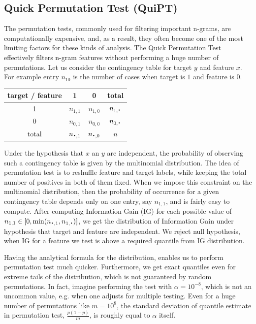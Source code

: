 \documentclass[a4,center,fleqn]{NAR}
\newcommand*{\bigcdot}{\raisebox{-0.25ex}{\scalebox{1.5}{$\cdot$}}}
\begin{document}
\subsection{Quick Permutation Test (QuiPT)}

The permutation tests, commonly used for filtering important n-grams, are 
computationally expensive, and, as a result, they often become one of the most
limiting factors for these kinds of analysis. 
The Quick Permutation Test effectively filters 
n-gram features without performing a huge number of permutations. Let us 
consider the contingency table for target $y$ and feature $x$. For example 
entry $n_{10}$ is the number of cases when target is $1$ and feature is $0$.

\begin{center}
\begin{tabular}{ | c || c | c | c | }
  \hline			
  target / feature & 1 & 0 & total\\ \hline
 1 & $n_{1,1}$ & $n_{1,0}$ & $n_{1,\bigcdot}$ \\
 0 & $n_{0,1}$ & $n_{0,0}$ & $n_{0,\bigcdot}$ \\ \hline
 total & $n_{\bigcdot,1}$ & $n_{\bigcdot,0}$ & $n$ \\
  \hline  
\end{tabular} 
\end{center}

  Under the hypothesis that $x$ an $y$ are independent, the probability of 
observing such a contingency table is given by the multinomial distribution. The 
idea of permutation test is to reshuffle feature and target labels, while 
keeping the total number of positives in both of them fixed. When we impose this 
constraint on the multinomial distribution, then the probability of occurrence 
for a given contingency table depends only on one entry, say $n_{1,1}$, and is 
fairly easy to compute. After computing Information Gain (IG) for each possible 
value of $n_{1,1} \in [0,\min(n_{\bigcdot, 1}, n_{1, \bigcdot})]$, we get the 
distribution of Information Gain under hypothesis that target and feature are 
independent. We reject null hypothesis, when IG for a feature we test is above a 
required quantile from IG distribution.

  Having the analytical formula for the distribution, enables us to perform 
permutation test much quicker. Furthermore, we get exact quantiles even for 
extreme tails of the distribution, which is not guaranteed by random 
permutations. In fact, imagine performing the test with $\alpha=10^{-8}$, which 
is not an uncommon value, e.g. when one adjusts for multiple testing. Even for a 
huge number of permutations like $m=10^8$, the standard deviation of quantile 
estimate in permutation test, $\frac{p(1-p)}{m}$, is roughly equal to $\alpha$ 
itself.
\end{document}
